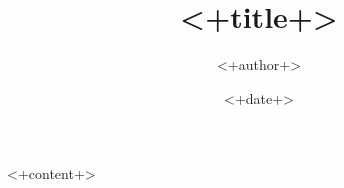 \documentclass[letterpaper]{article}
\title{<+title+>}
\author{<+author+>}
\date{<+date+>}
\begin{document}
\maketitle

<+content+>
\end{document}
